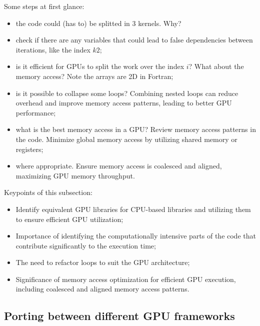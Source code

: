 


\par
Some steps at first glance:
\begin{itemize}
    \item the code could (has to) be splitted in 3 kernels. Why?
    \item check if there are any variables that could lead to false dependencies between iterations, like the index $k2$;
    \item is it efficient for GPUs to split the work over the index $i$? What about the memory access? Note the arrays are 2D in Fortran;
    \item is it possible to collapse some loops? Combining nested loops can reduce overhead and improve memory access patterns, leading to better GPU performance;
    \item what is the best memory access in a GPU? Review memory access patterns in the code. Minimize global memory access by utilizing shared memory or registers;
    \item where appropriate. Ensure memory access is coalesced and aligned, maximizing GPU memory throughput.
\end{itemize}


\par
Keypoints of this subsection:
\begin{itemize}
    \item Identify equivalent GPU libraries for CPU-based libraries and utilizing them to ensure efficient GPU utilization;
    \item Importance of identifying the computationally intensive parts of the code that contribute significantly to the execution time;
    \item The need to refactor loops to suit the GPU architecture;
    \item Significance of memory access optimization for efficient GPU execution, including coalesced and aligned memory access patterns.
\end{itemize}




\subsection{Porting between different GPU frameworks}


